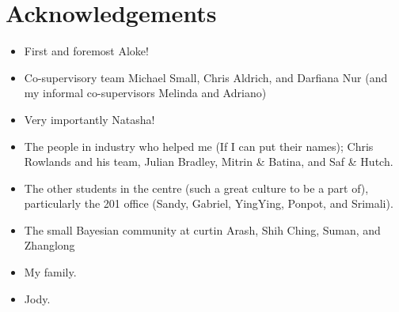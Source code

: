 
\chapter*{Acknowledgements} 
\begin{itemize}
  \item First and foremost Aloke!
  \item Co-supervisory team Michael Small, Chris Aldrich, and Darfiana Nur (and my informal co-supervisors Melinda and Adriano)
  \item Very importantly Natasha!
  \item The people in industry who helped me (If I can put their names); Chris Rowlands and his team, Julian Bradley, Mitrin \& Batina, and Saf \& Hutch.
  \item The other students in the centre (such a great culture to be a part of), particularly the 201 office (Sandy, Gabriel, YingYing, Ponpot, and Srimali).
  \item The small Bayesian community at curtin Arash, Shih Ching, Suman, and Zhanglong
  \item My family.
  \item Jody.
\end{itemize}
\vspace*{\fill}




